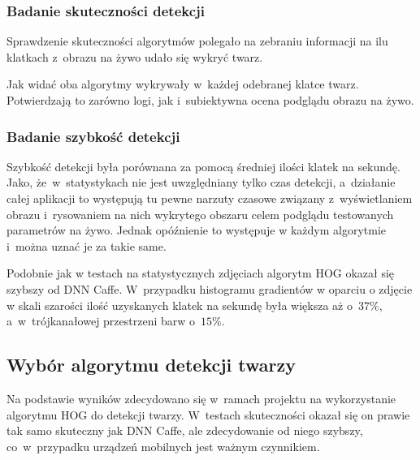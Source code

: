 \subsubsection{Badanie skuteczności detekcji}

Sprawdzenie skuteczności algorytmów polegało na zebraniu informacji na ilu klatkach z~obrazu na żywo udało się wykryć twarz.



Jak widać oba algorytmy wykrywały w~każdej odebranej klatce twarz. Potwierdzają to zarówno logi, jak i~subiektywna ocena podglądu obrazu na żywo. 




\subsubsection{Badanie szybkość detekcji} \label{section:face_speed_live}

Szybkość detekcji była porównana za pomocą średniej ilości klatek na sekundę. Jako, że~w~statystykach nie jest uwzględniany tylko czas detekcji, a~działanie całej aplikacji to występują tu pewne narzuty czasowe związany z~wyświetlaniem obrazu i~rysowaniem na nich wykrytego obszaru celem podglądu testowanych parametrów na żywo. Jednak opóźnienie to występuje w każdym algorytmie i~można uznać je za takie same.



Podobnie jak w testach na statystycznych zdjęciach algorytm HOG okazał się szybszy od DNN Caffe. W~przypadku histogramu gradientów w oparciu o zdjęcie w skali szarości ilość uzyskanych klatek na sekundę była większa aż o~$37 \%$, a~w~trójkanałowej przestrzeni barw o~$15 \%$.


\subsection{Wybór algorytmu detekcji twarzy}

Na podstawie wyników zdecydowano się w~ramach projektu na wykorzystanie algorytmu HOG do detekcji twarzy. W~testach skuteczności okazał się on prawie tak samo skuteczny jak DNN Caffe, ale zdecydowanie od niego szybszy, co~w~przypadku urządzeń mobilnych jest ważnym czynnikiem.
